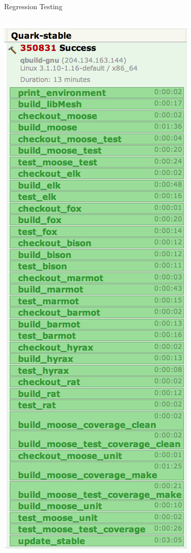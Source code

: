 \documentclass[mathserif]{beamer}
\begin{document}
\begin{frame}[t]{Regression Testing}
  \begin{columns}
    \includegraphics[width=\textwidth]{quark_stable_summary}


\end{columns}
\end{frame}
\end{document}
